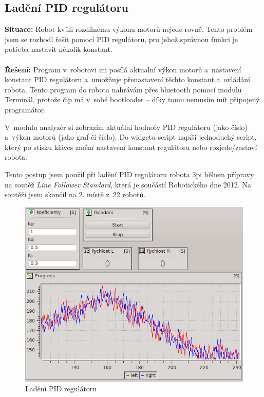 \documentclass[12pt, a4paper, oneside]{article}
\newcommand{\It}{\textit}  %
\begin{document}
\newpage
\subsection{Ladění PID regulátoru}
{\bf Situace:} Robot kvůli rozdílnému výkonu motorů nejede rovně. Tento problém jsem se rozhodl řešit pomocí PID regulátoru, pro jehož správnou funkci je potřeba nastavit několik konstant. \\
\\
{\bf Řešení:} Program v~robotovi mi posílá aktualní výkon motorů a~nastavení konstant PID regulátoru a~umožňuje přenastavení těchto konstant a~ovládání robota. Tento program do robota nahrávám přes bluetooth pomocí modulu Terminál, protože čip má v~sobě bootloader -- díky tomu nemusím mít připojený programátor.  

V~modulu analyzér si zobrazím aktuální hodnoty PID regulátoru (jako číslo) a~výkon motorů (jako graf či číslo). Do widgetu script napíši jednoduchý script, který po stisku kláves změní nastavení konstant regulátoru nebo rozjede/zastaví robota.

Tento postup jsem použil při ladění PID regulátoru robota 3pi\cite{3pi} během přípravy na soutěž \It{Line Follower Standard}, která je součástí Robotického dne 2012\cite{rob_den}. Na soutěži jsem skončil na 2. místě z~22 robotů\cite{robotday_res}.
\begin{figure}[H]
\begin{center}
\includegraphics[scale=0.55]{img/use_pid.png}
\caption{Ladění PID regulátoru}
\end{center}
\end{figure}
\end{document}
